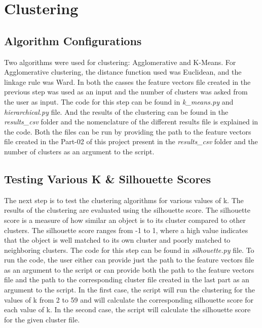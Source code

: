 \documentclass{article}
\newcommand\templateInstruction[1]{
\hl{#1}
}
\begin{document}
\section{Clustering}
\label{sec:clustering}

\subsection{Algorithm Configurations}
Two algorithms were used for clustering: Agglomerative and K-Means. For Agglomerative clustering, the distance function used was Euclidean, 
and the linkage rule was Ward. In both the casses the feature vectors file created in the previous step was used as an input and the 
number of clusters was asked from the user as input. The code for this step can be found in \textit{k\_means.py} and \textit{hierarchical.py} file.
And the results of the clustering can be found in the \textit{results\_csv} folder and the nomenclature of the different results file is explained in the code.
Both the files can be run by providing the path to the feature vectors file created in the Part-02 of this project present in the \textit{results\_csv} folder and the number of clusters as an argument to the script.

\subsection{Testing Various K \& Silhouette Scores}
The next step is to test the clustering algorithms for various values of k. The results of the clustering are evaluated using the silhouette score.
The silhouette score is a measure of how similar an object is to its cluster compared to other clusters. The silhouette score ranges from -1 to 1, where a high value indicates that the object is well matched to its own cluster and poorly matched to neighboring clusters.
The code for this step can be found in \textit{silhouette.py} file.
To run the code, the user either can provide just the path to the feature vectors file as an argument to the script or can provide both the path to the feature vectors file and the path to the corresponding cluster file created in the last part as an argument to the script.
In the first case, the script will run the clustering for the values of k from 2 to 59 and will calculate the corresponding silhouette score for each value of k. In the second case, the script will calculate the silhouette score for the given cluster file.
\end{document}
